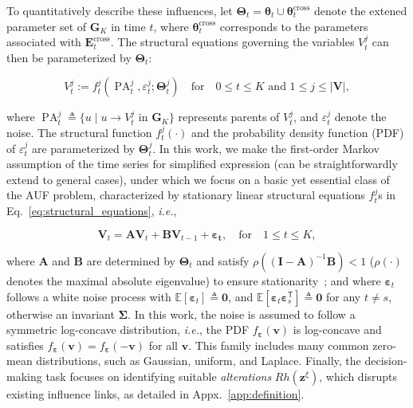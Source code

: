 \documentclass{article}
\theoremstyle{plain}
\theoremstyle{definition}
\theoremstyle{remark}
\def \ie {\textit{i.e.}}
\def \Eq {Eq.}
\def \E {\mathbf{E}}
\def \V {\mathbf{V}}
\def \G {\mathbf{G}}
\def \I {\mathbf{I}}
\def \A {\mathbf{A}}
\def \PA {\operatorname{PA}}
\def \V {\mathbf{V}}
\def \B {\mathbf{B}}
\def \v {\mathbf{v}}
\def \z {\mathbf{z}}
\begin{document}
To quantitatively describe these influences, let \(\bm{\Theta}_t=\bm{\theta}_t\cup\bm{\theta}_t^{\text{cross}}\) denote the extened parameter set of \(\G_K\) in time \(t\), where \(\bm{\theta}_t^{\text{cross}}\) corresponds to the parameters associated with \(\E_t^{\text{cross}}\). The structural equations governing the variables \(V_t^j\) can then be parameterized by \(\bm{\Theta}_t\):  


\vskip -0.12in
\begin{equation}
  \label{eq:structural_equations}
  V_t^j:=f^j_t\left(\PA_t^j, \varepsilon_t^j; \bm{\Theta}_t^j\right) \quad \text{for}\quad 0\leq t\leq K \text{ and } 1\leq j \leq |\V|,
\end{equation}
\vskip -0.08in

where $\PA_t^j \triangleq \{u \mid u \to V_t^j \text{ in } \G_K\}$ represents parents of $V_t^j$, and $\varepsilon_t^{j}$ denote the noise. The structural function \(f^j_t(\cdot)\) and the probability density function (PDF) of \(\varepsilon_t^j\) are parameterized by \(\bm{\Theta}_t^j\). 
In this work, we make the first-order Markov assumption of the time series for simplified expression (can be straightforwardly extend to general cases),   
under which we focus on a basic yet essential class of the AUF problem, characterized by stationary linear structural equations $f^j_t$s in \Eq~\eqref{eq:structural_equations}, \ie, 

\vskip -0.12in
\begin{equation}
  \label{eq:svar}
  \V_t = \A\V_{t} + \B\V_{t-1} + \bm{\varepsilon_t}, \quad \text{for}\quad 1\leq t\leq K, 
\end{equation}
\vskip -0.06in

where \(\A\) and \(\B\) are determined by \(\bm{\Theta}_t\) and satisfy \(\rho((\I - \A)^{-1}\B) < 1\) (\(\rho(\cdot)\) denotes the maximal absolute eigenvalue) to ensure stationarity~\citep{hamilton1994time}; and where \(\bm{\varepsilon}_t\) follows a white noise process with \(\mathbb{E}[\bm{\varepsilon}_t] \triangleq \bm{0}\), and \(\mathbb{E}[\bm{\varepsilon}_t \bm{\varepsilon}_s^\mathsf{T}] \triangleq \bm{0}\) for any \(t \neq s\), otherwise an invariant \(\bm{\Sigma}\). 
In this work, the noise is assumed to follow a symmetric log-concave distribution, \ie, the PDF \(f_{\bm{\varepsilon}}(\v)\) is log-concave and satisfies \(f_{\bm{\varepsilon}}(\v) = f_{\bm{\varepsilon}}(-\v)\) for all \(\v\). 
This family includes many common zero-mean distributions, such as Gaussian, uniform, and Laplace. 
Finally, the decision-making task focuses on identifying suitable \emph{alterations} \(Rh(\z^\xi)\), which disrupts existing influence links, as detailed in Appx.~\ref{app:definition}.
\end{document}
